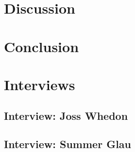 \documentclass[11pt]{report}
\begin{document}
\chapter{Discussion}


\chapter{Conclusion}


{}



\appendix

\chapter{Interviews}

\section{Interview: Joss Whedon}

\section{Interview: Summer Glau}
\end{document}
